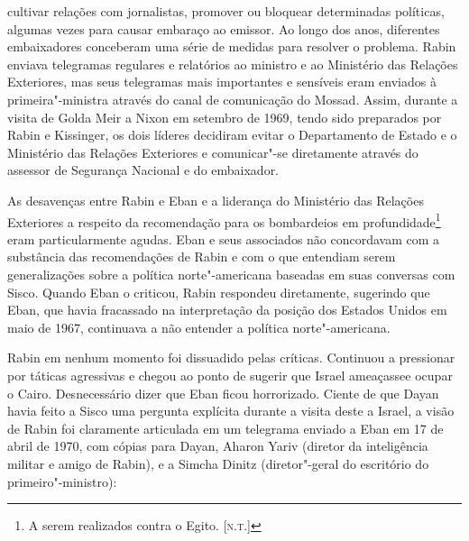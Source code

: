 cultivar relações com jornalistas, promover ou bloquear determinadas
políticas, algumas vezes para causar embaraço ao emissor. Ao longo dos
anos, diferentes embaixadores conceberam uma série de medidas para
resolver o problema. Rabin enviava telegramas regulares e relatórios ao
ministro e ao Ministério das Relações Exteriores, mas seus telegramas
mais importantes e sensíveis eram enviados à primeira"-ministra através
do canal de comunicação do Mossad. Assim, durante a visita de Golda Meir
a Nixon em setembro de 1969, tendo sido preparados por Rabin e
Kissinger, os dois líderes decidiram evitar o Departamento de Estado e o
Ministério das Relações Exteriores e comunicar"-se diretamente através do
assessor de Segurança Nacional e do embaixador.

As desavenças entre Rabin e Eban e a liderança do Ministério das Relações
Exteriores a respeito da recomendação para os bombardeios em
profundidade\footnote{A serem realizados contra o Egito. [\textsc{n.t.}]} eram particularmente agudas. Eban e seus associados não concordavam com a substância das recomendações de
Rabin e com o que entendiam serem generalizações sobre a política
norte"-americana baseadas em suas conversas com Sisco. Quando Eban o
criticou, Rabin respondeu diretamente, sugerindo que Eban, que havia
fracassado na interpretação da posição dos Estados Unidos em maio de 1967,
continuava a não entender a política norte"-americana.

Rabin em nenhum momento foi dissuadido pelas críticas. Continuou a
pressionar por táticas agressivas e chegou ao ponto de sugerir que
Israel ameaçassee ocupar o Cairo. Desnecessário dizer que Eban ficou
horrorizado. Ciente de que Dayan havia feito a Sisco uma pergunta
explícita durante a visita deste a Israel, a visão de Rabin foi
claramente articulada em um telegrama enviado a Eban em 17 de abril de
1970, com cópias para Dayan, Aharon Yariv (diretor da inteligência
militar e amigo de Rabin), e a Simcha Dinitz (diretor"-geral do
escritório do primeiro"-ministro):

